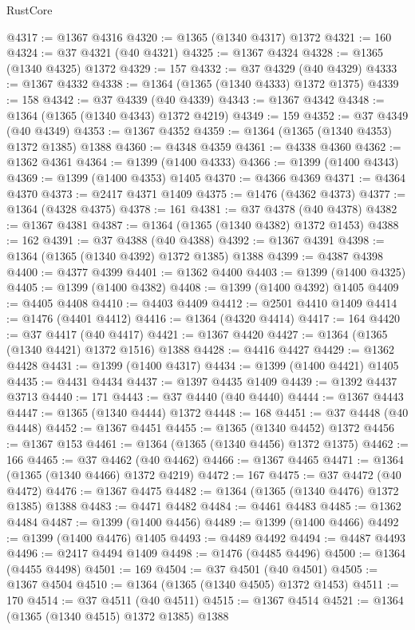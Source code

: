 \begin{lexlean}{RustCore}
\begin{coremodule}
@4317 := @1367 @4316
@4320 := @1365 (@1340 @4317) @1372
@4321 := 160
@4324 := @37 @4321 (@40 @4321)
@4325 := @1367 @4324
@4328 := @1365 (@1340 @4325) @1372
@4329 := 157
@4332 := @37 @4329 (@40 @4329)
@4333 := @1367 @4332
@4338 := @1364 (@1365 (@1340 @4333) @1372 @1375)
@4339 := 158
@4342 := @37 @4339 (@40 @4339)
@4343 := @1367 @4342
@4348 := @1364 (@1365 (@1340 @4343) @1372 @4219)
@4349 := 159
@4352 := @37 @4349 (@40 @4349)
@4353 := @1367 @4352
@4359 := @1364 (@1365 (@1340 @4353) @1372 @1385) @1388
@4360 := @4348 @4359
@4361 := @4338 @4360
@4362 := @1362 @4361
@4364 := @1399 (@1400 @4333)
@4366 := @1399 (@1400 @4343)
@4369 := @1399 (@1400 @4353) @1405
@4370 := @4366 @4369
@4371 := @4364 @4370
@4373 := @2417 @4371 @1409
@4375 := @1476 (@4362 @4373)
@4377 := @1364 (@4328 @4375)
@4378 := 161
@4381 := @37 @4378 (@40 @4378)
@4382 := @1367 @4381
@4387 := @1364 (@1365 (@1340 @4382) @1372 @1453)
@4388 := 162
@4391 := @37 @4388 (@40 @4388)
@4392 := @1367 @4391
@4398 := @1364 (@1365 (@1340 @4392) @1372 @1385) @1388
@4399 := @4387 @4398
@4400 := @4377 @4399
@4401 := @1362 @4400
@4403 := @1399 (@1400 @4325)
@4405 := @1399 (@1400 @4382)
@4408 := @1399 (@1400 @4392) @1405
@4409 := @4405 @4408
@4410 := @4403 @4409
@4412 := @2501 @4410 @1409
@4414 := @1476 (@4401 @4412)
@4416 := @1364 (@4320 @4414)
@4417 := 164
@4420 := @37 @4417 (@40 @4417)
@4421 := @1367 @4420
@4427 := @1364 (@1365 (@1340 @4421) @1372 @1516) @1388
@4428 := @4416 @4427
@4429 := @1362 @4428
@4431 := @1399 (@1400 @4317)
@4434 := @1399 (@1400 @4421) @1405
@4435 := @4431 @4434
@4437 := @1397 @4435 @1409
@4439 := @1392 @4437 @3713
@4440 := 171
@4443 := @37 @4440 (@40 @4440)
@4444 := @1367 @4443
@4447 := @1365 (@1340 @4444) @1372
@4448 := 168
@4451 := @37 @4448 (@40 @4448)
@4452 := @1367 @4451
@4455 := @1365 (@1340 @4452) @1372
@4456 := @1367 @153
@4461 := @1364 (@1365 (@1340 @4456) @1372 @1375)
@4462 := 166
@4465 := @37 @4462 (@40 @4462)
@4466 := @1367 @4465
@4471 := @1364 (@1365 (@1340 @4466) @1372 @4219)
@4472 := 167
@4475 := @37 @4472 (@40 @4472)
@4476 := @1367 @4475
@4482 := @1364 (@1365 (@1340 @4476) @1372 @1385) @1388
@4483 := @4471 @4482
@4484 := @4461 @4483
@4485 := @1362 @4484
@4487 := @1399 (@1400 @4456)
@4489 := @1399 (@1400 @4466)
@4492 := @1399 (@1400 @4476) @1405
@4493 := @4489 @4492
@4494 := @4487 @4493
@4496 := @2417 @4494 @1409
@4498 := @1476 (@4485 @4496)
@4500 := @1364 (@4455 @4498)
@4501 := 169
@4504 := @37 @4501 (@40 @4501)
@4505 := @1367 @4504
@4510 := @1364 (@1365 (@1340 @4505) @1372 @1453)
@4511 := 170
@4514 := @37 @4511 (@40 @4511)
@4515 := @1367 @4514
@4521 := @1364 (@1365 (@1340 @4515) @1372 @1385) @1388

\end{coremodule}
\end{lexlean}
